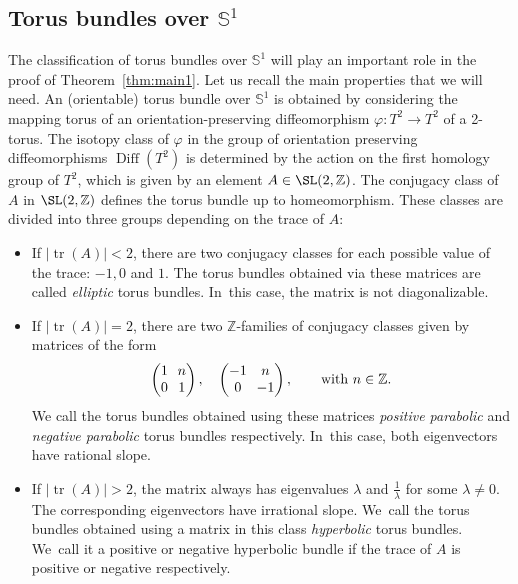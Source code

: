 \subsection{Torus bundles over $\mathbb{S}^1$}
The classification of torus bundles over $\mathbb{S}^1$ will play an important role in the proof of Theorem~\ref{thm:main1}. Let us recall the main properties that we will need. An (orientable) torus bundle over $\mathbb{S}^1$ is obtained by considering the mapping torus of an orientation-preserving diffeomorphism $\varphi:T^2\to T^2$ of a 2-torus. The isotopy class of $\varphi$ in the group of orientation preserving diffeomorphisms $\operatorname{Diff}(T^2)$ is determined by the action on the first homology group of $T^2$, which is given by an element $A\in \SL(2,\mathbb{Z})$.
The conjugacy class of $A$ in $\SL(2,\mathbb{Z})$ defines the torus bundle up to homeomorphism. These classes are divided into three groups depending on the trace of $A$:
\begin{itemize}
\item
If $|{\operatorname{tr}(A)}|<2$, there are two conjugacy classes for each possible value of the trace: $-1, 0$ and $1$. The torus bundles obtained via these matrices are called \textit{elliptic} torus bundles. In~this case, the matrix is not diagonalizable.
\item
If $|{\operatorname{tr}(A)}|=2$, there are two $\mathbb{Z}$-families of conjugacy classes given by matrices of the form
\[
\arraycolsep3.5pt
\begin{pmatrix}
1 & n \\
0 & 1
\end{pmatrix},\quad \begin{pmatrix}
-1 & n \\
0 & -1
\end{pmatrix}, \qquad\text{with } n\in \mathbb{Z}.
\]
We call the torus bundles obtained using these matrices \textit{positive parabolic} and \textit{negative parabolic} torus bundles respectively. In~this case, both eigenvectors have rational slope.
\item
If $|{\operatorname{tr}(A)}|>2$, the matrix always has eigenvalues $\lambda$ and $\frac{1}{\lambda}$ for some $\lambda\neq 0$. The corresponding eigenvectors have irrational slope. We~call the torus bundles obtained using a matrix in this class \textit{hyperbolic} torus bundles. We~call it a positive or negative hyperbolic bundle if the trace of $A$ is positive or negative respectively.
\end{itemize}

